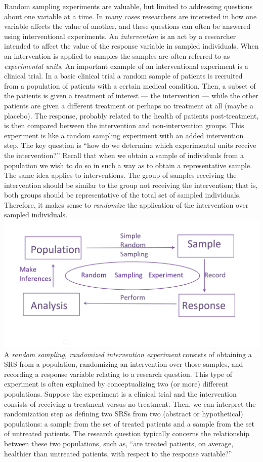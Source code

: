 \documentclass[]{book}
\begin{document}
Random sampling experiments are valuable, but limited to addressing
questions about one variable at a time. In many cases researchers are
interested in how one variable affects the value of another, and these
questions can often be answered using interventional experiments. An
\emph{intervention} is an act by a researcher intended to affect the
value of the response variable in sampled individuals. When an
intervention is applied to samples the samples are often referred to as
\emph{experimental units}. An important example of an interventional
experiment is a clinical trial. In a basic clinical trial a random
sample of patients is recruited from a population of patients with a
certain medical condition. Then, a subset of the patients is given a
treatment of interest --- the intervention --- while the other patients
are given a different treatment or perhaps no treatment at all (maybe a
placebo). The response, probably related to the health of patients
post-treatment, is then compared between the intervention and
non-intervention groups. This experiment is like a random sampling
experiment with an added intervention step. The key question is ``how do
we determine which experimental units receive the intervention?'' Recall
that when we obtain a sample of individuals from a population we wish to
do so in such a way as to obtain a representative sample. The same idea
applies to interventions. The group of samples receiving the
intervention should be similar to the group not receiving the
intervention; that is, both groups should be representative of the total
set of sampled individuals. Therefore, it makes sense to
\emph{randomize} the application of the intervention over sampled
individuals. \includegraphics{rsediagram.PNG} A \emph{random sampling,
randomized intervention experiment} consists of obtaining a SRS from a
population, randomizing an intervention over those samples, and
recording a response variable relating to a research question. This type
of experiment is often explained by conceptualizing two (or more)
different populations. Suppose the experiment is a clinical trial and
the intervention consists of receiving a treatment versus no treatment.
Then, we can interpret the randomization step as defining two SRSs from
two (abstract or hypothetical) populations: a sample from the set of
treated patients and a sample from the set of untreated patients. The
research question typically concerns the relationship between these two
populations, such as, ``are treated patients, on average, healthier than
untreated patients, with respect to the response variable?''
\end{document}
